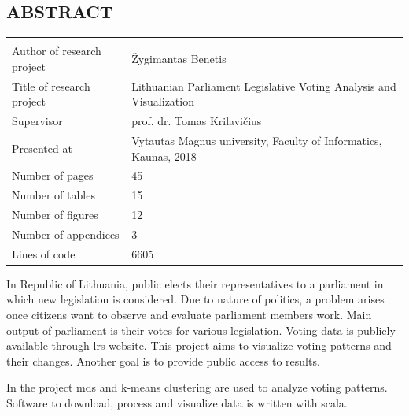 \documentclass[a4paper,12pt]{article}
\begin{document}
	
	
	
	\begin{center}
		\section*{ABSTRACT}
	\end{center}
	
	
	
	\noindent
	\begin{center}
		\begin{tabular}{L{4.5cm} L{8cm}}
			\\ 
			Author of research project & Žygimantas Benetis \\
			Title of research project & Lithuanian Parliament Legislative Voting Analysis and Visualization\\
			Supervisor & prof. dr. Tomas Krilavičius\\
			Presented at & Vytautas Magnus university, Faculty of Informatics, Kaunas, 2018\\
			Number of pages & 45\\
			Number of tables & 15\\
			Number of figures & 12\\
			Number of appendices & 3\\
			Lines of code & 6605\\
		\end{tabular}
	\end{center} 
	
	\vspace{5mm}
	
	In Republic of Lithuania, public elects their representatives to a parliament in which new legislation is considered. Due to nature of politics, a problem arises once citizens want to observe and evaluate parliament members work. Main output of parliament is their votes for various legislation. Voting data is publicly available through \gls{lrs} website. This project aims to visualize voting patterns and their changes. Another goal is to provide public access to results.
	
	In the project \gls{mds} and \gls{k-means} clustering are used to analyze voting patterns. Software to download, process and visualize  data is written with \gls{scala}.
	
	
	\clearpage
	
\end{document}
